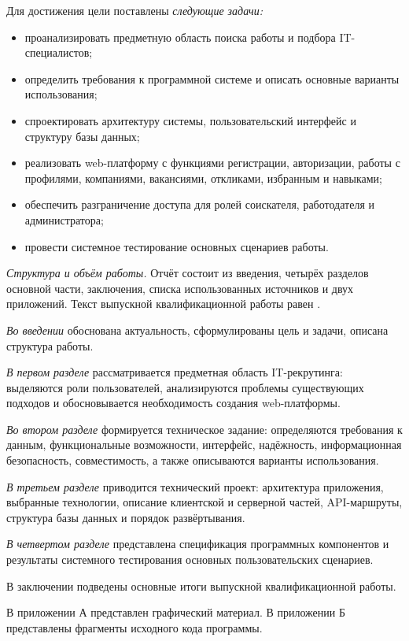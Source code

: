 Для достижения цели поставлены \emph{следующие задачи:}
\begin{itemize}
	\item проанализировать предметную область поиска работы и подбора IT-специалистов;
	\item определить требования к программной системе и описать основные варианты использования;
	\item спроектировать архитектуру системы, пользовательский интерфейс и структуру базы данных;
	\item реализовать web-платформу с функциями регистрации, авторизации, работы с профилями, компаниями, вакансиями, откликами, избранным и навыками;
	\item обеспечить разграничение доступа для ролей соискателя, работодателя и администратора;
	\item провести системное тестирование основных сценариев работы.
\end{itemize}

\emph{Структура и объём работы.} Отчёт состоит из введения, четырёх разделов основной части, заключения, списка использованных источников и двух приложений. Текст выпускной квалификационной работы равен .

\emph{Во введении} обоснована актуальность, сформулированы цель и задачи, описана структура работы.

\emph{В первом разделе} рассматривается предметная область IT-рекрутинга: выделяются роли пользователей, анализируются проблемы существующих подходов и обосновывается необходимость создания web-платформы.

\emph{Во втором разделе} формируется техническое задание: определяются требования к данным, функциональные возможности, интерфейс, надёжность, информационная безопасность, совместимость, а также описываются варианты использования.

\emph{В третьем разделе} приводится технический проект: архитектура приложения, выбранные технологии, описание клиентской и серверной частей, API-маршруты, структура базы данных и порядок развёртывания.

\emph{В четвертом разделе} представлена спецификация программных компонентов и результаты системного тестирования основных пользовательских сценариев.

В заключении подведены основные итоги выпускной квалификационной работы.

В приложении А представлен графический материал. В приложении Б представлены фрагменты исходного кода программы.
